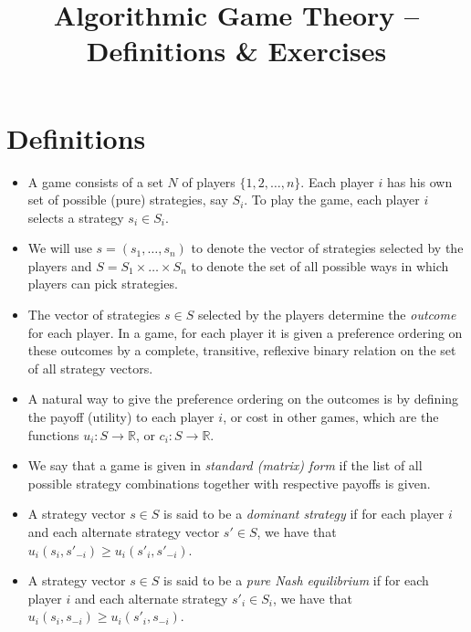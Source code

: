 \documentclass{article}
\title{Algorithmic Game Theory -- Definitions \& Exercises}
\theoremstyle{definition}
\newcommand{\R}{\mathbb{R}}
\begin{document}
\maketitle


\section{Definitions}

\begin{itemize}
\item A game consists of a set $N$ of players $\{1, 2, \dots, n\}$.
Each player $i$ has his own set of possible (pure) strategies, say $S_i$.
To play the game, each player $i$ selects a strategy $s_i\in S_i$.

\item
We will use $s = (s_1, \dots, s_n)$ to denote the vector of strategies selected by the
players and $S = S_1\times\dots\times S_n$ to denote the set of all possible ways in which players can pick
strategies.

\item
The vector of strategies $s\in S$ selected by the players determine the \emph{outcome} for each player.
In a game, for each player it is given a preference ordering on these outcomes by
a complete, transitive, reflexive binary relation on the set of all strategy vectors.

\item A natural way to give the preference ordering on the outcomes is by defining
the payoff (utility) to each player $i$, or cost in other games, which are the functions
$u_i:S\to \R$, or $c_i:S\to \R$.

\item We say that a game is given in \emph{standard (matrix) form} if the list of all possible
strategy combinations together with respective payoffs is given.

\item
A strategy vector $s\in S$ is said to be a \emph{dominant strategy} if for each
player $i$ and each alternate strategy vector $s'\in  S$, we have that
$u_i(s_i, s'_{-i})\ge  u_i(s'_i, s'_{-i})$.

\item
A strategy vector $s\in S$ is said to be a \emph{pure Nash equilibrium} if for each player $i$ and each
alternate strategy $s'_i\in  S_i$, we have that $u_i(s_i, s_{-i})\ge  u_i(s'_i, s_{-i})$.


\end{itemize}
\end{document}
